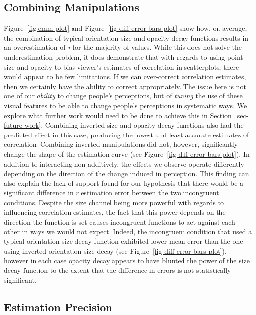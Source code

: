\documentclass[sigconf]{acmart}
\begin{document}
\hypertarget{sec-combining}{%
\subsection{Combining Manipulations}\label{sec-combining}}

Figure~\ref{fig-emm-plot} and Figure~\ref{fig-diff-error-bars-plot} show
how, on average, the combination of typical orientation size and opacity
decay functions results in an overestimation of \emph{r} for the
majority of values. While this does not solve the underestimation
problem, it does demonstrate that with regards to using point size and
opacity to bias viewer's estimates of correlation in scatterplots, there
would appear to be few limitations. If we can over-correct correlation
estimates, then we certainly have the ability to correct appropriately.
The issue here is not one of our \emph{ability} to change people's
perceptions, but of \emph{tuning} the use of these visual features to be
able to change people's perceptions in systematic ways. We explore what
further work would need to be done to achieve this in
Section~\ref{sec-future-work}. Combining inverted size and opacity decay
functions also had the predicted effect in this case, producing the
lowest and least accurate estimates of correlation. Combining inverted
manipulations did not, however, significantly change the shape of the
estimation curve (see Figure~\ref{fig-diff-error-bars-plot}). In
addition to interacting non-additively, the effects we observe operate
differently depending on the direction of the change induced in
perception. This finding can also explain the lack of support found for
our hypothesis that there would be a significant difference in \emph{r}
estimation error between the two incongruent conditions. Despite the
size channel being more powerful with regards to influencing correlation
estimates, the fact that this power depends on the direction the
function is set causes incongruent functions to act against each other
in ways we would not expect. Indeed, the incongruent condition that used
a typical orientation size decay function exhibited lower mean error
than the one using inverted orientation size decay (see
Figure~\ref{fig-diff-error-bars-plot}), however in each case opacity
decay appears to have blunted the power of the size decay function to
the extent that the difference in errors is not statistically
significant.

\hypertarget{estimation-precision}{%
\subsection{Estimation Precision}\label{estimation-precision}}
\end{document}
